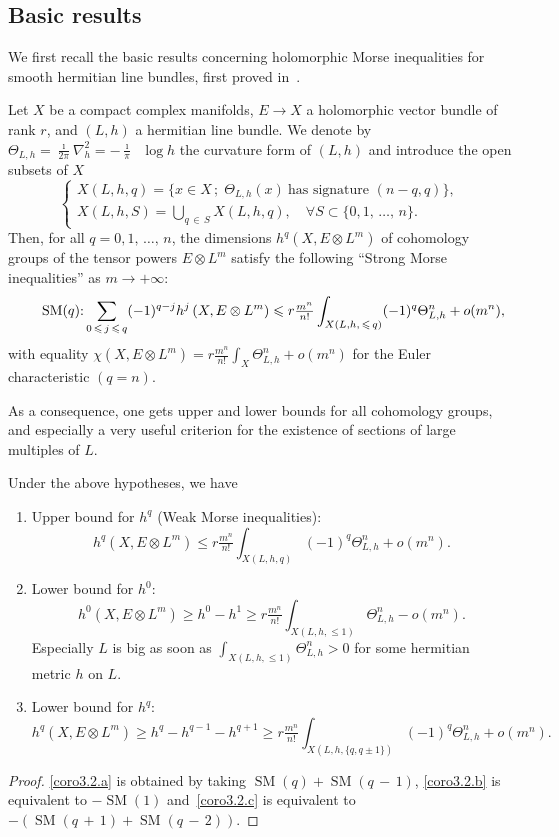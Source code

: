\documentclass[AHL,Unicode,longabstracts,published]{cedram}
\DeclareMathOperator{\SM}{SM}
\DeclareMathOperator{\ddbar}{\partial\bar\partial}
\let\leq\leqslant
\let\geq\geqslant
\newcommand*{\alphenumi}{\renewcommand*{\theenumi}{\alph{enumi}}}
\let\oldforall\forall
\renewcommand*{\forall}{\mathrel{\oldforall}}
\begin{document}
\subsection{Basic results} We first recall the basic results concerning holomorphic Morse inequalities for smooth hermitian line bundles, first proved in~\cite{Dem85}.
\begin{theo}\label{theo:Morse}
Let $X$ be a compact complex manifolds, $E\to X$ a holomorphic vector bundle of rank $r$, and $(L,h)$ a hermitian line bundle. We denote by
$\Theta_{L,h}=\tfrac{\imath}{ 2\pi}\nabla_h^2=-\tfrac{\imath}{\pi}\ddbar\log h$ the curvature form of $(L,h)$ and introduce the open subsets of $X$
\[
\tag{$*$}
\begin{cases}
X(L,h,q)=\big\{x\in X\,;\;\Theta_{L,h}(x)~\text{has signature $(n-q,q)$}\big\},
\\
\displaystyle X(L,h,S)=\bigcup_{q\,\in\,S} X(L,h,q),\quad \forall S\subset\{0,1,\,\dotsc,\,n\}.
\end{cases}
\]
Then, for all $q=0,1,\,\dotsc,\,n$, the dimensions $h^q(X,E\otimes L^m)$ of cohomology groups of the tensor powers $E\otimes L^m$ satisfy the following ``Strong Morse inequalities'' as $m\to +\infty$:
\[
\tag*{$\SM(q)$:}
\sum_{0\,\leq\,j\,\leq\,q} (-1)^{q-j}h^j\left(X,E\otimes L^m\right) \leq r \tfrac{m^n}{ n!}
\int_{X(L,h,\,\leq\,q)}(-1)^q\Theta_{L,h}^n+o(m^n),
\]
with equality
$\chi(X,E\otimes L^m)= r\tfrac{m^n}{ n!}\int_X \Theta_{L,h}^n + o(m^n)$ for the Euler characteristic $(q=n)$.
\end{theo}

As a consequence, one gets upper and lower bounds for all cohomology groups, and especially a very useful criterion for the existence of sections of large multiples of $L$.

\begin{coro}
Under the above hypotheses, we have
\begin{enumerate}\alphenumi
\item\label{coro3.2.a} Upper bound for $h^q$ (Weak Morse inequalities):
\[
h^q(X,E\otimes L^m)\leq r \tfrac{m^n}{ n!}\int_{X(L,h,q)} (-1)^q \Theta_{L,h}^n + o(m^n).
\]
\item\label{coro3.2.b} Lower bound for $h^0$:
\[
h^0(X,E\otimes L^m)\geq h^0-h^1\ge r\tfrac{m^n}{ n!}\int_{X(L,h,\leq 1)}\Theta_{L,h}^n -o(m^n).
\]
Especially $L$ is big as soon as $\int_{X(L,h,\leq 1)}\Theta_{L,h}^n>0$ for some hermitian metric $h$ on $L$.
\item\label{coro3.2.c} Lower bound for $h^q$:
\[
h^q(X,E\otimes L^m)\geq h^q-h^{q-1}-h^{q+1}\ge r\tfrac{m^n}{ n!}\int_{X(L,h,\{q,q\pm 1\})} (-1)^q \Theta_{L,h}^n + o(m^n).
\]
\end{enumerate}
\end{coro}
\begin{proof}
\eqref{coro3.2.a} is obtained by taking $\SM(q)+\SM(q\,{-}\,1)$, \eqref{coro3.2.b} is equivalent to
$-\SM(1)$ and~\eqref{coro3.2.c} is equivalent to $-(\SM(q\,{+}\,1)+\SM(q\,{-}\,2))$.
\end{proof}
\end{document}
